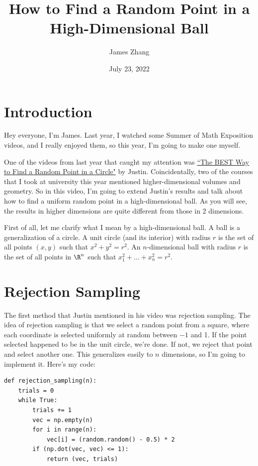 \documentclass{article}
\title{How to Find a Random Point in a High-Dimensional Ball}
\author{James Zhang}
\date{July 23, 2022}
\begin{document}
\maketitle

\section{Introduction}

Hey everyone, I'm James. Last year, I watched some Summer of Math Exposition videos, and I really enjoyed them, so this year, I'm going to make one myself.

One of the videos from last year that caught my attention was \href{https://www.youtube.com/watch?v=4y_nmpv-9lI&list=PLnQX-jgAF5pTkwtUuVpqS5tuWmJ-6ZM-Z&index=6&t=3s}{``The BEST Way to Find a Random Point in a Circle"} by Justin. Coincidentally, two of the courses that I took at university this year mentioned higher-dimensional volumes and geometry. So in this video, I'm going to extend Justin's results and talk about how to find a uniform random point in a high-dimensional ball. As you will see, the results in higher dimensions are quite different from those in 2 dimensions.

First of all, let me clarify what I mean by a high-dimensional ball. A ball is a generalization of a circle. A unit circle (and its interior) with radius $r$ is the set of all points $(x, y)$ such that $x^2 + y^2 = r^2$. An $n$-dimensional ball with radius $r$ is the set of all points in $\R^n$ such that $x_1^2 + \ldots + x_n^2 = r^2$.

\section{Rejection Sampling}

The first method that Justin mentioned in his video was rejection sampling. The idea of rejection sampling is that we select a random point from a square, where each coordinate is selected uniformly at random between $-1$ and 1. If the point selected happened to be in the unit circle, we're done. If not, we reject that point and select another one. This generalizes easily to $n$ dimensions, so I'm going to implement it. Here's my code:

\begin{verbatim}
def rejection_sampling(n):
    trials = 0
    while True:
        trials += 1
        vec = np.empty(n)
        for i in range(n):
            vec[i] = (random.random() - 0.5) * 2
        if (np.dot(vec, vec) <= 1):
            return (vec, trials)
\end{verbatim}
\end{document}
